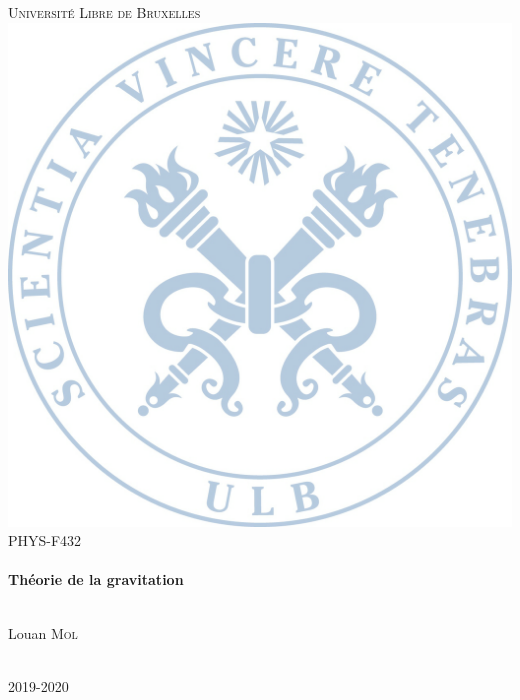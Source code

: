 \begin{titlepage}

    \center
    
    \textsc{\LARGE Université Libre de Bruxelles}\\[1.5cm]
    \includegraphics[scale=.1]{Pictures/background.png}\\[0.5cm]
    \textsc{\large PHYS-F432}\\[0.5cm]  
    
    
    \HRule \\[0.6cm]
    {\huge \bfseries Théorie de la gravitation}\\[0.4cm]
    \HRule \\[1.5cm]
    
    
    \begin{minipage}{0.4\textwidth}
    \begin{center} \large
    Louan \textsc{Mol}
    \end{center}
    
    \end{minipage}\\[8cm]
    
    {\large 2019-2020}\\[2cm]
    
    \vfill

\end{titlepage}